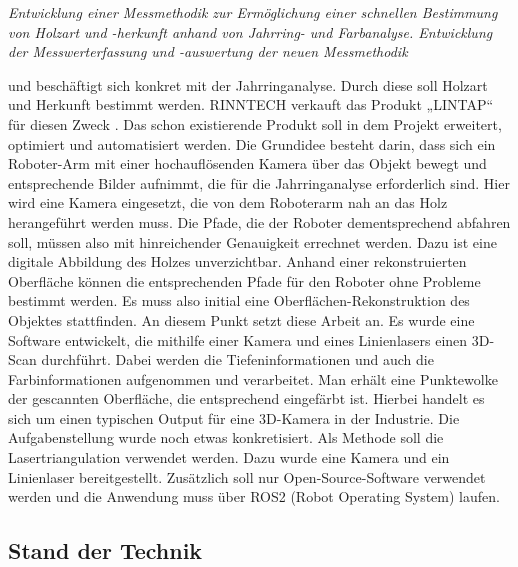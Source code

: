 	\textit{\glqq Entwicklung einer Messmethodik zur Ermöglichung einer schnellen Bestimmung von Holzart und -herkunft anhand von Jahrring- und Farbanalyse. Entwicklung der Messwerterfassung und -auswertung der neuen Messmethodik\grqq}
	
	und beschäftigt sich konkret mit der Jahrringanalyse. Durch diese soll Holzart und Herkunft bestimmt werden. RINNTECH verkauft das Produkt „LINTAP“ für diesen Zweck \citep[vgl.][Produkte]{noauthor_rinntech_nodate}. Das schon existierende Produkt soll in dem Projekt erweitert, optimiert und automatisiert werden. Die Grundidee besteht darin, dass sich ein Roboter-Arm mit einer hochauflösenden Kamera über das Objekt bewegt und entsprechende Bilder aufnimmt, die für die Jahrringanalyse erforderlich sind. Hier wird eine Kamera eingesetzt, die von dem Roboterarm nah an das Holz herangeführt werden muss. Die Pfade, die der Roboter dementsprechend abfahren soll, müssen also mit hinreichender Genauigkeit errechnet werden. Dazu ist eine digitale Abbildung des Holzes unverzichtbar. Anhand einer rekonstruierten Oberfläche können die entsprechenden Pfade für den Roboter ohne Probleme bestimmt werden. Es muss also initial eine Oberflächen-Rekonstruktion des Objektes stattfinden. An diesem Punkt setzt diese Arbeit an. Es wurde eine Software entwickelt, die mithilfe einer Kamera und eines Linienlasers einen 3D-Scan durchführt. Dabei werden die Tiefeninformationen und auch die Farbinformationen aufgenommen und verarbeitet. Man erhält eine Punktewolke der gescannten Oberfläche, die entsprechend eingefärbt ist. Hierbei handelt es sich um einen typischen Output für eine 3D-Kamera in der Industrie. Die Aufgabenstellung wurde noch etwas konkretisiert. Als Methode soll die Lasertriangulation verwendet werden. Dazu wurde eine Kamera und ein Linienlaser bereitgestellt. Zusätzlich soll nur Open-Source-Software verwendet werden und die Anwendung muss über ROS2 (Robot Operating System) laufen.
	
	\subsection{Stand der Technik}

